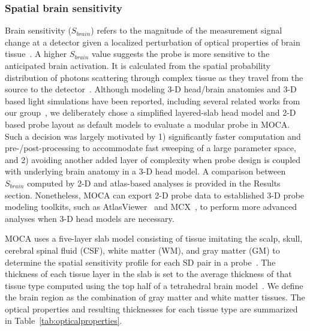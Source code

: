\subsubsection{Spatial brain sensitivity}
\label{sssec:averagebrainsensitivity}
Brain sensitivity ($S_{brain}$) refers to the magnitude of the measurement signal change at a detector given a localized perturbation of optical properties of brain tissue~\cite{Strangman2013}. A higher $S_{brain}$ value suggests the probe is more sensitive to the anticipated brain activation. It is calculated from the spatial probability distribution of photons scattering through complex tissue as they travel from the source to the detector~\cite{Brigadoi2015}. Although modeling 3-D head/brain anatomies and 3-D based light simulations have been reported, including several related works from our group~\cite{Fang2009,Fang2009a,Fang2010,Brain2Mesh2020}, we deliberately chose a simplified layered-slab head model and 2-D based probe layout as default models to evaluate a modular probe in MOCA. Such a decision was largely motivated by 1) significantly faster computation and pre-/post-processing to accommodate fast sweeping of a large parameter space, and 2) avoiding another added layer of complexity when probe design is coupled with underlying brain anatomy in a 3-D head model. A comparison between $S_{brain}$ computed by 2-D and atlas-based analyses is provided in the Results section. Nonetheless, MOCA can export 2-D probe data to established 3-D probe modeling toolkits, such as AtlasViewer~\cite{Aasted2015} and MCX~\cite{Fang2009}, to perform more advanced analyses when 3-D head models are necessary.

MOCA uses a five-layer slab model consisting of tissue imitating the scalp, skull, cerebral spinal fluid (CSF), white matter (WM), and gray matter (GM) to determine the spatial sensitivity profile for each SD pair in a probe~\cite{Okada2003}. The thickness of each tissue layer in the slab is set to the average thickness of that tissue type computed using the top half of a tetrahedral brain model~\cite{Sanchez2012}. We define the brain region as the combination of gray matter and white matter tissues. The optical properties and resulting thicknesses for each tissue type are summarized in Table~\ref{tab:opticalproperties}.

